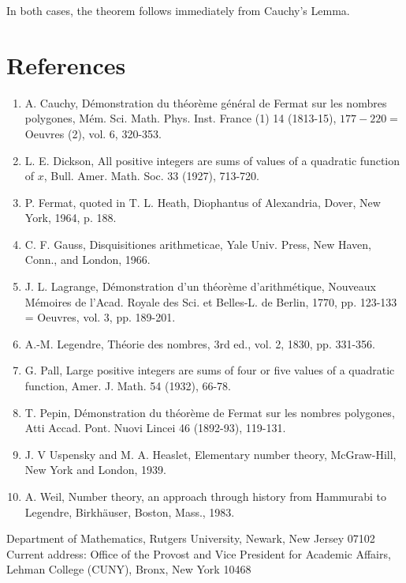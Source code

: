 \documentclass[10pt]{article}
\begin{document}
In both cases, the theorem follows immediately from Cauchy's Lemma.

\section*{References}
\begin{enumerate}
  \item A. Cauchy, Démonstration du théorème général de Fermat sur les nombres polygones, Mém. Sci. Math. Phys. Inst. France (1) 14 (1813-15), $177-220=$ Oeuvres (2), vol. 6, 320-353.
  \item L. E. Dickson, All positive integers are sums of values of a quadratic function of $x$, Bull. Amer. Math. Soc. 33 (1927), 713-720.
  \item P. Fermat, quoted in T. L. Heath, Diophantus of Alexandria, Dover, New York, 1964, p. 188.
  \item C. F. Gauss, Disquisitiones arithmeticae, Yale Univ. Press, New Haven, Conn., and London, 1966.
  \item J. L. Lagrange, Démonstration d'un théorème d'arithmétique, Nouveaux Mémoires de l'Acad. Royale des Sci. et Belles-L. de Berlin, 1770, pp. 123-133 = Oeuvres, vol. 3, pp. 189-201.
  \item A.-M. Legendre, Théorie des nombres, 3rd ed., vol. 2, 1830, pp. 331-356.
  \item G. Pall, Large positive integers are sums of four or five values of a quadratic function, Amer. J. Math. 54 (1932), 66-78.
  \item T. Pepin, Démonstration du théorème de Fermat sur les nombres polygones, Atti Accad. Pont. Nuovi Lincei 46 (1892-93), 119-131.
  \item J. V Uspensky and M. A. Heaslet, Elementary number theory, McGraw-Hill, New York and London, 1939.
  \item A. Weil, Number theory, an approach through history from Hammurabi to Legendre, Birkhäuser, Boston, Mass., 1983.
\end{enumerate}

Department of Mathematics, Rutgers University, Newark, New Jersey 07102\\
Current address: Office of the Provost and Vice President for Academic Affairs, Lehman College (CUNY), Bronx, New York 10468
\end{document}
